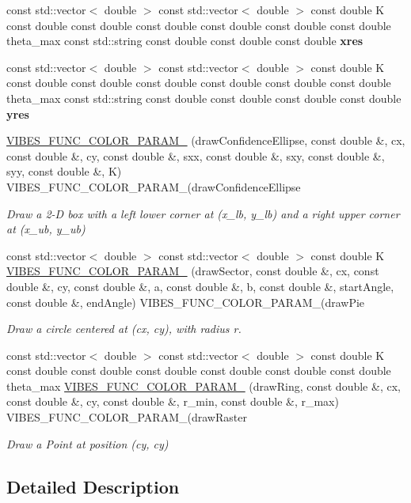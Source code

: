 \begin{DoxyCompactItemize}
\item 
const std\+::vector$<$ double $>$ const std\+::vector$<$ double $>$ const double K const double const double const double const double const double const double theta\+\_\+max const std\+::string const double const double const double {\bfseries xres}
\item 
const std\+::vector$<$ double $>$ const std\+::vector$<$ double $>$ const double K const double const double const double const double const double const double theta\+\_\+max const std\+::string const double const double const double const double {\bfseries yres}
\item 
\hyperlink{group__drawing_gaa1a216c77912e57296d3092253e0b2e4}{V\+I\+B\+E\+S\+\_\+\+F\+U\+N\+C\+\_\+\+C\+O\+L\+O\+R\+\_\+\+P\+A\+R\+A\+M\+\_} (draw\+Confidence\+Ellipse, const double \&, cx, const double \&, cy, const double \&, sxx, const double \&, sxy, const double \&, syy, const double \&, K) V\+I\+B\+E\+S\+\_\+\+F\+U\+N\+C\+\_\+\+C\+O\+L\+O\+R\+\_\+\+P\+A\+R\+A\+M\+\_(draw\+Confidence\+Ellipse
\begin{DoxyCompactList}\small\item\em Draw a 2-\/D box with a left lower corner at ({\itshape x\+\_\+lb}, {\itshape y\+\_\+lb}) and a right upper corner at ({\itshape x\+\_\+ub}, {\itshape y\+\_\+ub}) \end{DoxyCompactList}\item 
const std\+::vector$<$ double $>$ const std\+::vector$<$ double $>$ const double K \hyperlink{group__drawing_gabc42f6a4ac88539dfba5ca2a06dd38bb}{V\+I\+B\+E\+S\+\_\+\+F\+U\+N\+C\+\_\+\+C\+O\+L\+O\+R\+\_\+\+P\+A\+R\+A\+M\+\_} (draw\+Sector, const double \&, cx, const double \&, cy, const double \&, a, const double \&, b, const double \&, start\+Angle, const double \&, end\+Angle) V\+I\+B\+E\+S\+\_\+\+F\+U\+N\+C\+\_\+\+C\+O\+L\+O\+R\+\_\+\+P\+A\+R\+A\+M\+\_(draw\+Pie
\begin{DoxyCompactList}\small\item\em Draw a circle centered at ({\itshape cx}, {\itshape cy}), with radius {\itshape r}. \end{DoxyCompactList}\item 
const std\+::vector$<$ double $>$ const std\+::vector$<$ double $>$ const double K const double const double const double const double const double const double theta\+\_\+max \hyperlink{group__drawing_ga60266299e74aa49b8633e013deaab601}{V\+I\+B\+E\+S\+\_\+\+F\+U\+N\+C\+\_\+\+C\+O\+L\+O\+R\+\_\+\+P\+A\+R\+A\+M\+\_} (draw\+Ring, const double \&, cx, const double \&, cy, const double \&, r\+\_\+min, const double \&, r\+\_\+max) V\+I\+B\+E\+S\+\_\+\+F\+U\+N\+C\+\_\+\+C\+O\+L\+O\+R\+\_\+\+P\+A\+R\+A\+M\+\_(draw\+Raster
\begin{DoxyCompactList}\small\item\em Draw a Point at position (cy, cy) \end{DoxyCompactList}\end{DoxyCompactItemize}


\subsection{Detailed Description}
